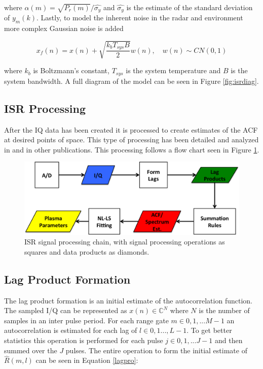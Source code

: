 \documentclass[draft,ras]{agutex}
\begin{document}
\begin{article}
\noindent where $\alpha(m) = \sqrt{P_r(m)}/\hat{\sigma_y}$ and $\hat{\sigma_y}$ is the estimate of the standard deviation of $y_m(k)$. Lastly, to model the inherent noise in the radar and environment more complex Gaussian noise is added

\begin{equation}
\label{eq4}
x_f(n) = x(n) +\sqrt{\frac{k_bT_{sys}B}{2}} w(n), \quad w(n)\sim CN(0,1)
\end{equation}

\noindent where $k_b$ is Boltzmann's constant, $T_{sys}$ is the system temperature and $B$ is the system bandwidth.
A full diagram of the model can be seen in Figure \ref{fig:isrdiag}.

\subsection{ISR Processing}

After the IQ data has been created it is processed to create estimates of the ACF at desired points of space. This type of processing has been detailed and analyzed in \citep{farley1969} and in other publications. This processing follows a flow chart seen in Figure \ref{fig:chain}.

\begin{figure}[!t]
\centering
\includegraphics[width=6in]{datastackchain}
\caption{ISR signal processing chain, with signal processing operations as squares and data products as diamonds.}
\label{fig:chain}
\end{figure}



\subsection{Lag Product Formation}
The lag product formation is an initial estimate of the autocorrelation function. The sampled I/Q can be represented as $x(n) \in\mathbb{C}^N$ where $N$ is the number of samples in an inter pulse period. For each range gate $m\in 0,1,...M-1$ an autocorrelation is estimated for each lag of $l \in 0,1...,L-1$.  To get better statistics this operation is performed for each pulse $j\in 0,1,...J-1$ and then summed over the $J$ pulses. The entire operation to form the initial estimate of $\hat{R}(m,l)$ can be seen in Equation \ref{lagpro}:


\end{article}
\end{document}
